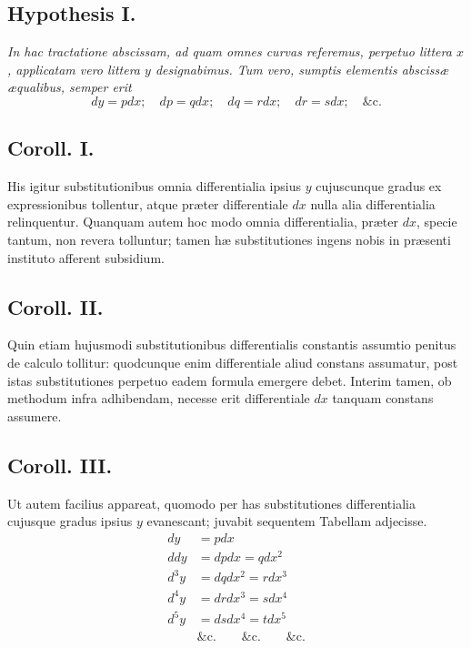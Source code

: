 \subsection*{Hypothesis I.}
\textit{In hac tractatione abscissam, ad quam omnes curvas referemus, perpetuo littera $x$, applicatam vero littera $y$ designabimus. Tum vero, sumptis elementis abscissæ æqualibus, semper erit}
\[
 dy=pdx;\quad dp=qdx;\quad dq=rdx;\quad dr=sdx;\quad\text{\&c.}
\]
\subsection*{Coroll. I.}
His igitur substitutionibus omnia differentialia ipsius $y$ cujuscunque gradus ex expressionibus tollentur, atque præter differentiale $dx$ nulla alia differentialia relinquentur. Quanquam autem hoc modo omnia differentialia, præter $dx$, specie tantum, non revera tolluntur; tamen hæ substitutiones ingens nobis in præsenti instituto afferent subsidium.
\subsection*{Coroll. II.}
Quin etiam hujusmodi substitutionibus differentialis constantis assumtio penitus de calculo tollitur: quodcunque enim differentiale aliud constans assumatur, post istas substitutiones perpetuo eadem formula emergere debet. Interim tamen, ob methodum infra adhibendam, necesse erit differentiale $dx$ tanquam constans assumere.
\subsection*{Coroll. III.}
Ut autem facilius appareat, quomodo per has substitutiones differentialia cujusque gradus ipsius $y$ evanescant; juvabit sequentem Tabellam adjecisse.
\[
\begin{aligned}
 dy&=pdx\\
 ddy&=dpdx=qdx^2\\
 d^3y&=dqdx^2=rdx^3\\
 d^4y&=drdx^3=sdx^4\\
 d^5y&=dsdx^4=tdx^5\\
 &\text{\&c.}\qquad\text{\&c.}\qquad\text{\&c.}
\end{aligned}
\]
